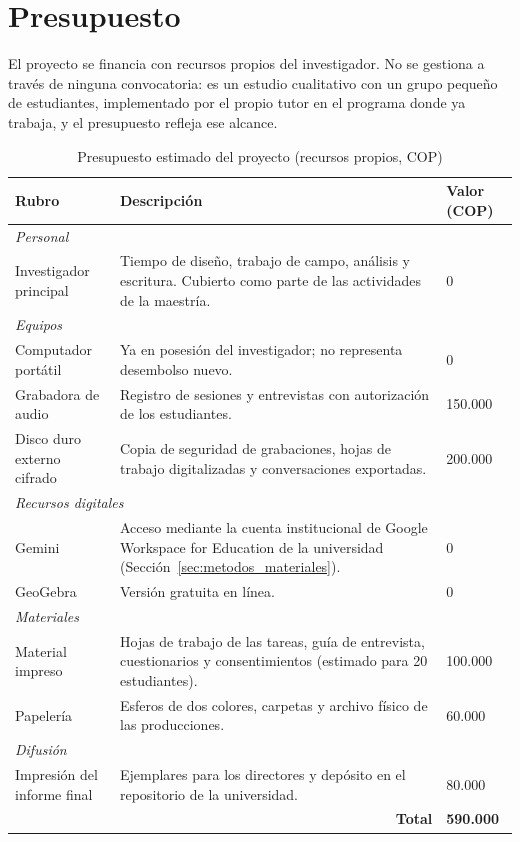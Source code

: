 \section{Presupuesto}
\label{sec:presupuesto}

El proyecto se financia con recursos propios del investigador. No se gestiona a través de ninguna convocatoria: es un estudio cualitativo con un grupo pequeño de estudiantes, implementado por el propio tutor en el programa donde ya trabaja, y el presupuesto refleja ese alcance.

\begin{table}[H]
\centering
\caption{Presupuesto estimado del proyecto (recursos propios, COP)}
\label{tab:presupuesto}
\small
\begin{tabular}{|p{5.5cm}|p{6cm}|p{2cm}|}
\hline
\textbf{Rubro} & \textbf{Descripción} & \textbf{Valor (COP)} \\
\hline
\multicolumn{3}{|l|}{\textit{Personal}} \\
\hline
Investigador principal & Tiempo de diseño, trabajo de campo, análisis y escritura. Cubierto como parte de las actividades de la maestría. & 0 \\
\hline
\multicolumn{3}{|l|}{\textit{Equipos}} \\
\hline
Computador portátil & Ya en posesión del investigador; no representa desembolso nuevo. & 0 \\
\hline
Grabadora de audio & Registro de sesiones y entrevistas con autorización de los estudiantes. & 150.000 \\
\hline
Disco duro externo cifrado & Copia de seguridad de grabaciones, hojas de trabajo digitalizadas y conversaciones exportadas. & 200.000 \\
\hline
\multicolumn{3}{|l|}{\textit{Recursos digitales}} \\
\hline
Gemini & Acceso mediante la cuenta institucional de Google Workspace for Education de la universidad (Sección~\ref{sec:metodos_materiales}). & 0 \\
\hline
GeoGebra & Versión gratuita en línea. & 0 \\
\hline
\multicolumn{3}{|l|}{\textit{Materiales}} \\
\hline
Material impreso & Hojas de trabajo de las tareas, guía de entrevista, cuestionarios y consentimientos (estimado para 20 estudiantes). & 100.000 \\
\hline
Papelería & Esferos de dos colores, carpetas y archivo físico de las producciones. & 60.000 \\
\hline
\multicolumn{3}{|l|}{\textit{Difusión}} \\
\hline
Impresión del informe final & Ejemplares para los directores y depósito en el repositorio de la universidad. & 80.000 \\
\hline
\multicolumn{2}{|r|}{\textbf{Total}} & \textbf{590.000} \\
\hline
\end{tabular}
\end{table}

